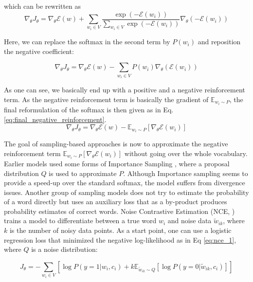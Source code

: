 \documentclass[11pt]{article}
\begin{document}
which can be rewritten as 
\begin{equation}
\nabla_\theta J_\theta =\nabla_\theta \mathcal{E}(w) 
+\sum_{w_i \in V}  \frac{\exp (-\mathcal{E}(w_i))}{\sum_{w_i \in V} \exp (-\mathcal{E}(w_i))}  \nabla_\theta (-\mathcal{E}(w_i))
\label{eq:negative_reinforcement_6}
\end{equation}

Here, we can replace the softmax in the second term by $P(w_i)$ and reposition the negative coefficient:

\begin{equation}
\nabla_\theta J_\theta =\nabla_\theta \mathcal{E}(w) 
-\sum_{w_i \in V}  P(w_i)  \nabla_\theta (\mathcal{E}(w_i))\label{eq:negative_reinforcement_7}
\end{equation}

As one can see, we basically end up with a positive and a negative reinforcement term. As the negative reinforcement term is basically the gradient of $\mathbb{E}_{w_i\sim P}$, the final reformulation of the softmax is then given as in Eq. \ref{eq:final_negative_reinforcement}.
\begin{equation}
\nabla_\theta J_\theta =\nabla_\theta \mathcal{E}(w)  - \mathbb{E}_{w_i\sim P}[\nabla _{\theta}\mathcal{E}(w_i)] 
\label{eq:final_negative_reinforcement}
\end{equation}

The goal of sampling-based approaches is now to approximate the negative reinforcement term $\mathbb{E}_{w_i\sim P}[\nabla _{\theta}\mathcal{E}(w_i)] $ without going over the whole vocabulary.
Earlier models used some forms of Importance Sampling \cite{liu2008monte,bengio2003quick,bengio2008adaptive,cho2015using}, where a proposal distribution $Q$ is used to approximate $P$. Although Importance sampling seems to provide a speed-up over the standard softmax, the model suffers from divergence issues.
Another group of sampling models does not try to estimate the probability of a word directly but uses an auxiliary loss that as a by-product produces probability estimates of correct words. Noise Contrastive Estimation (NCE, \cite{gutmann2010noise,mnih2012fast}) trains a model to differentiate between a true word $w_i$ and noise data $\tilde{w}_{ik}$, where $k$ is the number of noisy data points. As a start point, one can use a logistic regression loss that minimized the negative log-likelihood as in Eq \ref{eq:nce_1}, where $Q$ is a noise distribution:

\begin{equation}
J_{\theta}  = - \sum_{w_i \in V} [\log P(y=1|w_i,c_i) + k \mathbb{E}_{\tilde{w}_{ik}\sim Q}[\log P (y = 0|\tilde{w}_{ik},c_i)]]
\label{eq:nce_1}
\end{equation}
\end{document}
